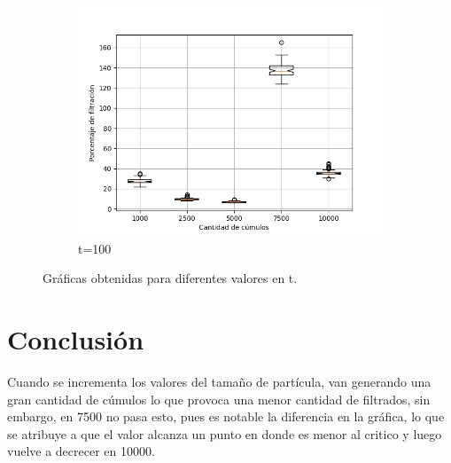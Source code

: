 \documentclass{article}
\begin{document}
\begin{figure}
\begin{subfigure}[b]{0.49\linewidth}
            \includegraphics[width=\linewidth]{tareaocho100.png}
            \caption{t=100}
            \label{fig:westminster_aerea}
        \end{subfigure}
        \caption{Gr\'aficas obtenidas para diferentes valores en t.}
        \label{fig:westminster}
\end{figure}

\section{Conclusi\'on}

Cuando se incrementa los valores del tama\~no de part\'icula, van generando una gran cantidad de c\'umulos lo que provoca una menor cantidad de filtrados, sin embargo, en 7500 no pasa esto, pues es notable la diferencia en la gr\'afica, lo que se atribuye a que el valor alcanza un punto en donde es menor al critico y luego vuelve a decrecer en 10000.



\end{document}
